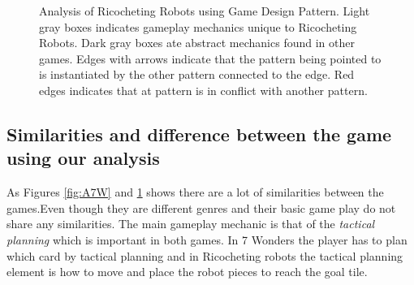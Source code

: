\documentclass[a4paper]{article}
\begin{document}
\begin{figure}[htb]

  \caption{Analysis of Ricocheting Robots using Game Design Pattern. Light gray boxes indicates gameplay mechanics unique to Ricocheting Robots. Dark gray boxes ate abstract mechanics found in other games. Edges with arrows indicate that the pattern being pointed to is instantiated by the other pattern connected to the edge. Red edges indicates that at pattern is in conflict with another pattern.} 
  \label{fig:RRW}
\end{figure}


\subsection{Similarities and difference between the game using our analysis}
  As Figures \ref{fig:A7W} and \ref{fig:RRW} shows there are a lot of similarities between the games.Even though they are different genres and their basic game play do not share any similarities. The main gameplay mechanic is that of the \textit{tactical planning} which is important in both games. In 7 Wonders the player has to plan which card by tactical planning and in Ricocheting robots the tactical planning element is how to move and place the robot pieces to reach the goal tile. 
\end{document}

